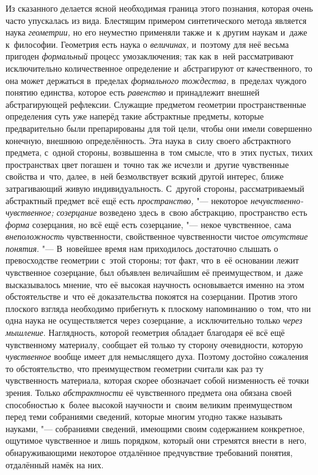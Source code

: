 Из сказанного делается ясной необходимая граница этого
познания, которая очень часто упускалась из вида. Блестящим примером
синтетического метода является наука
{\em геометрии,} но его
неуместно применяли также и~к другим наукам и~даже к~философии. Геометрия
есть наука о {\em величинах,}
и~поэтому для неё весьма пригоден
{\em формальный} процесс
умозаключения; так как в~ней рассматривают исключительно
количественное определение и~абстрагируют от качественного, то она может
держаться в~пределах {\em формального
тождества,} в~пределах чуждого понятию единства, которое
есть {\em равенство} и
принадлежит внешней абстрагирующей рефлексии. Служащие предметом геометрии
пространственные определения суть уже наперёд такие абстрактные предметы,
которые предварительно были препарированы для той цели, чтобы они имели
совершенно конечную, внешнюю определённость. Эта наука в~силу своего
абстрактного предмета, с~одной стороны, возвышенна в~том смысле, что в~этих
пустых, тихих пространствах цвет погашен и~точно так же исчезли и~другие
чувственные свойства и~что, далее, в~ней безмолвствует всякий другой
интерес, ближе затрагивающий живую индивидуальность. С~другой стороны,
рассматриваемый абстрактный предмет всё ещё есть
{\em пространство,} "---
некоторое
{\em нечувственно-чувственное;}
{\em созерцание} возведено
здесь в~свою абстракцию, пространство есть
{\em форма} созерцания,
но всё ещё есть созерцание, "--- некое чувственное, сама
{\em внеположность}
чувственности, свойственное чувственности чистое
{\em отсутствие понятия}. "---
В~новейшее время нам приходилось достаточно слышать о
превосходстве геометрии с~этой стороны; тот факт, что в~её основании лежит
чувственное созерцание, был объявлен величайшим её преимуществом, и~даже
высказывалось мнение, что её высокая научность основывается именно на этом
обстоятельстве и~что её доказательства покоятся на
созерцании.
Против этого плоского взгляда необходимо прибегнуть к
плоскому напоминанию о~том, что ни одна наука не осуществляется через
созерцание, а~исключительно только
{\em через мышление}.
Наглядность, которой геометрия обладает благодаря её всё ещё
чувственному материалу, сообщает ей только ту сторону очевидности, которую
{\em чувственное} вообще
имеет для немыслящего духа. Поэтому достойно сожаления то обстоятельство,
что преимуществом геометрии считали как раз ту чувственность материала,
которая скорее обозначает собой низменность её точки зрения. Только
{\em абстрактности} её
чувственного предмета она обязана своей способностью к~более высокой
научности и~своим великим преимуществом перед теми собраниями сведений,
которые многим угодно также называть науками, "--- собраниями
сведений, имеющими своим содержанием конкретное, ощутимое чувственное и
лишь порядком, который они стремятся внести в~него, обнаруживающими
некоторое отдалённое предчувствие требований понятия, отдалённый намёк на
них.

